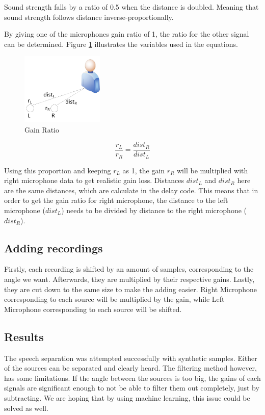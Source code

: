 Sound strength falls by a ratio of 0.5 when the distance is doubled. Meaning that sound strength follows 
distance inverse-proportionally.
 
By giving one of the microphones gain ratio of 1, the ratio for the other signal can be determined. Figure 
\ref{fig:ratioDependence} illustrates the variables used in the equations.

\begin{figure}[htp]
	\centering
	\includegraphics[width=0.35\textwidth]{Illustrations/gainRatio.jpg}
	\caption{Gain Ratio}
	\label{fig:ratioDependence}
\end{figure}
\begin{equation}
	\frac{r_L}{r_R} = \frac{dist_R}{dist_L}
\end{equation}
 
Using this proportion and keeping \(r_L\) as 1, the gain \(r_R\) will be multiplied with 
right microphone data to get realistic gain loss. Distances \(dist_L\) and \(dist_R\) here are the same 
distances, which are calculate in the delay code. This means that in order to get the gain ratio for right 
microphone, the distance to the left microphone (\(dist_L\)) needs to be divided by distance to the right 
microphone (\(dist_R\)).
\subsection*{Adding recordings}
Firstly, each recording is shifted by an amount of samples, corresponding to the angle we want. 
Afterwards, they are multiplied by their respective gains. Lastly, they are cut down to the same size to 
make the adding easier.
Right Microphone corresponding to each source will be multiplied by the gain, while Left Microphone  
corresponding to each source will be shifted.
\subsection*{Results} 
The speech separation was attempted successfully with synthetic samples. Either of the sources can be 
separated and clearly heard. The filtering method however, has some limitations. If the angle between
the sources is too big, the gains of each signals are significant enough to not be able to filter them
out completely, just by subtracting. We are hoping that by using machine learning, this issue could
be solved as well.